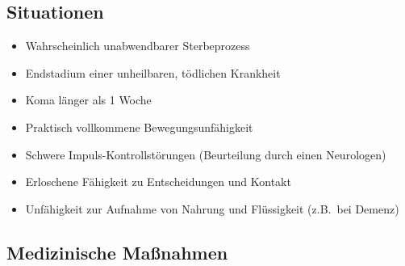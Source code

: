 \documentclass[pdftex,12pt,a4paper]{article}
\begin{document}
\subsection{Situationen}

\begin{itemize}

\item Wahrscheinlich unabwendbarer Sterbeprozess

\item Endstadium einer unheilbaren, tödlichen Krankheit

\item Koma länger als 1 Woche

\item Praktisch vollkommene Bewegungsunfähigkeit

\item Schwere Impuls-Kontrollstörungen (Beurteilung durch einen Neurologen)

\item Erloschene Fähigkeit zu Entscheidungen und Kontakt

\item  Unfähigkeit zur Aufnahme von Nahrung und Flüssigkeit (z.B.\ bei Demenz)


\end{itemize}


\subsection{Medizinische Maßnahmen}
\end{document}
